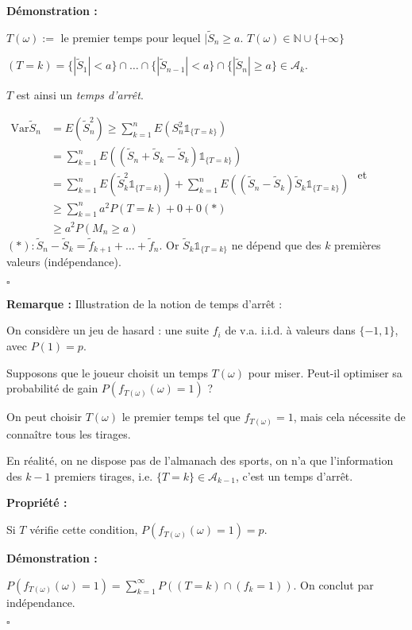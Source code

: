 \documentclass[10pt,a4paper,notitlepage ]{report}
\newcommand{\N}{\mathbb N}
\newcommand{\A}{\mathcal A}
\newcommand{\1}{\mathds 1}
\newcommand{\var}{\mathrm{Var}}
\newcounter{th}
\newenvironment{propriete}[1][]{
	\begin{tcolorbox}
		\textbf{Propriété #1 : }
}
{\end{tcolorbox}}
\newenvironment{demo}[1][]{

	\textbf{Démonstration #1 :}
}{\begin{flushright}
	$\square$
\end{flushright}
}
\newenvironment{rem}{
	
		\textbf{Remarque :}}{}
\begin{document}
\begin{demo}
	$T(\omega) :=$ le premier temps pour lequel $|\tilde S_n \ge a$. $T(\omega) \in \N \cup \{+\infty\}$
	
	$(T = k) = \{|\tilde S_1| < a \} \cap \dots \cap \{|\tilde S_{n-1}| < a \} \cap \{|\tilde S_n| \ge a \} \in \A_k$.
	
	$T$ est ainsi un \emph{temps d'arrêt}.
	
	$\begin{aligned}
		\var \tilde S_n &= E(\tilde S_n^2) \ge \sum_{k=1}^n E(S_n^2 \mathds 1_{\{T=k\}}) \\
		&= \sum_{k=1}^n E((\tilde S_n + \tilde S_k - \tilde S_k) \mathds 1_{\{T=k\}}) \\
		&= \sum_{k=1}^n E(\tilde S_k^2 \mathds 1_{\{T=k\}}) + \sum_{k=1}^n E((\tilde S_n - \tilde S_k)\tilde S_k \mathds 1_{\{T=k\}}) \\
		&\ge \sum_{k=1}^n a^2P(T=k) + 0 + 0 (*) \\
		&\ge a^2 P(M_n \ge a)
	\end{aligned}$
et $(*) : \tilde S_n - \tilde S_k = \tilde f_{k+1} + \dots + \tilde f_n$. Or $\tilde S_k \mathds 1_{\{T=k\}}$ ne dépend que des $k$ premières valeurs (indépendance).
\end{demo}

\begin{rem}
	Illustration de la notion de temps d'arrêt :
	
	On considère un jeu de hasard : une suite $f_i$ de v.a. i.i.d. à valeurs dans $\{-1, 1\}$, avec $P(1) =p$.
	
	Supposons que le joueur choisit un temps $T(\omega)$ pour miser. Peut-il optimiser sa probabilité de gain $P(f_{T(\omega)}(\omega) = 1)$ ?
	
	On peut choisir $T(\omega)$ le premier temps tel que $f_{T(\omega)} = 1$, mais cela nécessite de connaître tous les tirages.
	
	En réalité, on ne dispose pas de l'almanach des sports, on n'a que l'information des $k-1$ premiers tirages, i.e. $\{T=k\} \in \A_{k-1}$, c'est un temps d'arrêt.
	
	\begin{propriete}
		Si $T$ vérifie cette condition, $P(f_{T(\omega)}(\omega)=1) = p$.
	\end{propriete}
	\begin{demo}
		$P(f_{T(\omega)}(\omega)=1) = \sum_{k=1}^\infty P((T=k) \cap (f_k =1))$. On conclut par indépendance.
	\end{demo}
\end{rem}
\end{document}
